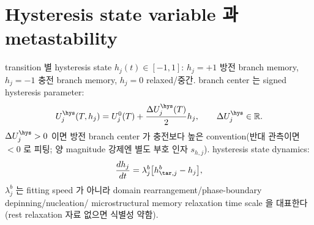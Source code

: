 \section{Hysteresis state variable 과 metastability}\label{sec:ch5_hstate}
transition 별 hysteresis state $h_j(t)\in[-1,1]$: $h_j=+1$ 방전 branch memory, $h_j=-1$ 충전 branch memory,
$h_j=0$ relaxed/중간. branch center 는 signed hysteresis parameter:
\begin{equation}
U_j^\hys(T,h_j)=U_j^0(T)+\frac{\Delta U_j^\hys(T)}{2}h_j,\qquad \Delta U_j^\hys\in\mathbb R.
\label{eq:ch5_hys_center}
\end{equation}
$\Delta U_j^\hys>0$ 이면 방전 branch center 가 충전보다 높은 convention(반대 관측이면 $<0$ 로 피팅; 양
magnitude 강제엔 별도 부호 인자 $s_{h,j}$). hysteresis state dynamics:
\begin{equation}
\frac{dh_j}{dt}=\lambda_j^b\big[h_{\tar,j}^b-h_j\big],
\label{eq:ch5_h_dyn}
\end{equation}
$\lambda_j^b$ 는 fitting speed 가 아니라 domain rearrangement/phase-boundary depinning/nucleation/
microstructural memory relaxation time scale 을 대표한다(rest relaxation 자료 없으면 식별성 약함).

